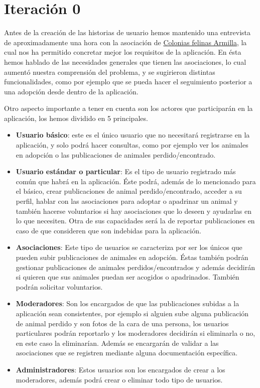 \section{Iteración 0} \label{it0}

Antes de la creación de las historias de usuario hemos mantenido una entrevista de aproximadamente una hora con la asociación de \href{https://www.instagram.com/coloniasfelinasarmilla/}{Colonias felinas Armilla}, la cual nos ha permitido concretar mejor los requisitos de la aplicación. En ésta hemos hablado de las necesidades generales que tienen las asociaciones, lo cual aumentó nuestra comprensión del problema, y se sugirieron distintas funcionalidades, como por ejemplo que se pueda hacer el seguimiento posterior a una adopción desde dentro de la aplicación.

Otro aspecto importante a tener en cuenta son los actores que participarán en la aplicación, los hemos dividido en 5 principales.
\begin{itemize}
	\item \textbf{Usuario básico}: este es el único usuario que no necesitará registrarse en la aplicación, y solo podrá hacer consultas, como por ejemplo ver los animales en adopción o las publicaciones de animales perdido/encontrado.
	\item \textbf{Usuario estándar o particular}: Es el tipo de usuario registrado más común que habrá en la aplicación. Éste podrá, además de lo mencionado para el básico, crear publicaciones de animal perdido/encontrado, acceder a su perfil, hablar con las asociaciones para adoptar o apadrinar un animal y también hacerse voluntarios si hay asociaciones que lo deseen y ayudarlas en lo que necesiten. Otra de sus capacidades será la de reportar publicaciones en caso de que consideren que son indebidas para la aplicación.
	\item \textbf{Asociaciones}: Este tipo de usuarios se caracteriza por ser los únicos que pueden subir publicaciones de animales en adopción. Éstas también podrán gestionar publicaciones de animales perdidos/encontrados y además decidirán si quieren que sus animales puedan ser acogidos o apadrinados. También podrán solicitar voluntarios.
	\item \textbf{Moderadores}: Son los encargados de que las publicaciones subidas a la aplicación sean consistentes, por ejemplo si alguien sube alguna publicación de animal perdido y son fotos de la cara de una persona, los usuarios particulares podrán reportarlo y los moderadores decidirán si eliminarla o no, en este caso la eliminarían. Además se encargarán de validar a las asociaciones que se registren mediante alguna documentación específica.
	\item \textbf{Administradores}: Estos usuarios son los encargados de crear a los moderadores, además podrá crear o eliminar todo tipo de usuarios.
	
\end{itemize}
